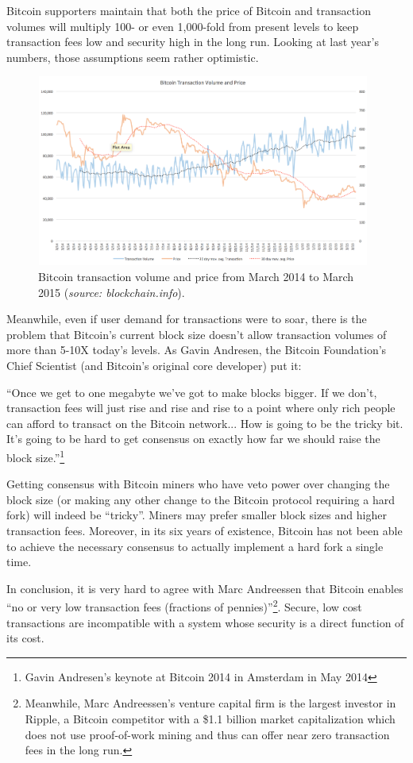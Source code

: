 \documentclass[a4paper,11pt]{article}
\begin{document}
Bitcoin supporters maintain that both the price of Bitcoin and transaction volumes will multiply 100- or even 1,000-fold from present levels to keep transaction fees low and security high in the long run. Looking at last year's numbers, those assumptions seem rather optimistic. 

\begin{figure}[H]
\centering
\includegraphics[width=110mm,height=63mm]{02_blockchain.png}
\caption{Bitcoin transaction volume and price from March 2014 to March 2015 (\textit{source: blockchain.info}).}
\end{figure}

Meanwhile, even if user demand for transactions were to soar, there is the problem that Bitcoin's current block size doesn't allow transaction volumes of more than 5-10X today's levels. As Gavin Andresen, the Bitcoin Foundation's Chief Scientist (and Bitcoin's original core developer) put it:

``Once we get to one megabyte we've got to make blocks bigger. If we don't, transaction fees will just rise and rise and rise to a point where only rich people can afford to transact on the Bitcoin network... How is going to be the tricky bit. It's going to be hard to get consensus on exactly how far we should raise the block size.''\footnote{Gavin Andresen's keynote at Bitcoin 2014 in Amsterdam in May 2014}

Getting consensus with Bitcoin miners who have veto power over changing the block size (or making any other change to the Bitcoin protocol requiring a hard fork)  will indeed be ``tricky''. Miners may prefer smaller block sizes and higher transaction fees. Moreover, in its six years of existence, Bitcoin has not been able to achieve the necessary consensus to actually implement a hard fork a single time. 

In conclusion, it is very hard to agree with Marc Andreessen that Bitcoin enables ``no or very low transaction fees (fractions of pennies)''\footnote{Meanwhile, Marc Andreessen's venture capital firm is the largest investor in Ripple, a Bitcoin competitor with a \$1.1 billion market capitalization which does not use proof-of-work mining and thus can offer near zero transaction fees in the long run.}. Secure, low cost transactions are incompatible with a system whose security is a direct function of its cost.
\end{document}
